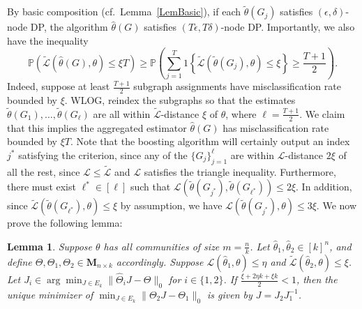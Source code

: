 \documentclass{article}
\newtheorem{lemma}{Lemma}
\newcommand{\mprob}{\mathbb{P}}
\newcommand{\thetahat}{\ensuremath{\widehat{\theta}}}
\newcommand{\Thetahat}{\ensuremath{\widehat{\Theta}}}
\begin{document}
By basic composition (cf.\ Lemma~\ref{LemBasic}), if each $\widetilde{\theta}(G_j)$ satisfies $(\epsilon, \delta)$-node DP, the algorithm $\thetahat(G)$ satisfies $(T\epsilon, T\delta)$-node DP. Importantly, we also have the inequality
\begin{equation}
\label{EqnComErr}
\mprob\left(\widetilde{\mathcal{L}}(\thetahat(G), \theta) \le \xi T\right) \ge \mprob\left(\sum_{j=1}^T 1\left\{\widetilde{\mathcal{L}}(\widetilde{\theta}(G_j), \theta) \le \xi\right\} \ge \frac{T+1}{2}\right).
\end{equation}
Indeed, suppose at least $\frac{T+1}{2}$ subgraph assignments have misclassification rate bounded by $\xi$. WLOG, reindex the subgraphs so that the estimates $\widetilde{\theta}(G_1), \dots, \widetilde{\theta}(G_\ell)$ are all within $\widetilde{\mathcal{L}}$-distance $\xi$ of $\theta$, where $\ell = \frac{T+1}{2}$. We claim that this implies the aggregated estimator $\thetahat(G)$ has misclassification rate bounded by $\xi T$. Note that the boosting algorithm will certainly output an index $j^*$ satisfying the criterion, since any of the $\{G_j\}_{j=1}^\ell$ are within $\mathcal{L}$-distance $2\xi$ of all the rest, since $\mathcal{L} \le \widetilde{\mathcal{L}}$ and $\mathcal{L}$ satisfies the triangle inequality. Furthermore, there must exist $\ell^* \in [\ell]$ such that $\mathcal{L}(\widetilde{\theta}(G_{j^*}), \widetilde{\theta}(G_{\ell^*})) \le 2\xi$. In addition, since $\widetilde{\mathcal{L}}(\widetilde{\theta}(G_{\ell^*}), \theta) \leq \xi$ by assumption, we have $\mathcal{L}(\widetilde{\theta}(G_{j^*}), \theta) \leq 3\xi$. We now prove the following lemma:

\begin{lemma}
\label{LemAlign}
Suppose $\theta$ has all communities of size $m = \frac{n}{k}$. Let $\thetahat_1, \thetahat_2 \in [k]^n$, and define $\Theta, \Theta_1, \Theta_2 \in \mathbf{M}_{n \times k}$ accordingly. Suppose $\mathcal{L}(\thetahat_1, \theta) \le \eta$ and $\widetilde{\mathcal{L}}(\thetahat_2, \theta) \le \xi$. Let $J_i \in \arg\min_{J \in E_k} \|\Thetahat_i J - \Theta\|_0$ for $i \in \{1, 2\}$. If $\frac{\xi + 2\eta k + \xi k}{2} < 1$, then the unique minimizer of $\min_{J \in E_k} \|\Theta_2 J - \Theta_1\|_0$ is given by $J = J_2 J_1^{-1}$.
\end{lemma}
\end{document}
